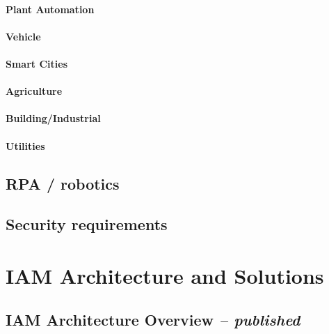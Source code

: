 \hypertarget{plant-automation}{%
\subsubsection{Plant Automation}\label{plant-automation}}

\hypertarget{vehicle}{%
\subsubsection{Vehicle}\label{vehicle}}

\hypertarget{smart-cities}{%
\subsubsection{Smart Cities}\label{smart-cities}}

\hypertarget{agriculture}{%
\subsubsection{Agriculture}\label{agriculture}}

\hypertarget{buildingindustrial}{%
\subsubsection{Building/Industrial}\label{buildingindustrial}}

\hypertarget{utilities}{%
\subsubsection{Utilities}\label{utilities}}

\hypertarget{rpa-robotics}{%
\section{RPA / robotics}\label{rpa-robotics}}

\hypertarget{security-requirements}{%
\section{Security requirements}\label{security-requirements}}

\hypertarget{iam-architecture-and-solutions}{%
\chapter{IAM Architecture and Solutions
}\label{iam-architecture-and-solutions}}

\hypertarget{iam-architecture-overview-published}{%
\section{\texorpdfstring{IAM Architecture Overview \emph{--
published}}{IAM Architecture Overview -- published}}\label{iam-architecture-overview-published}}

